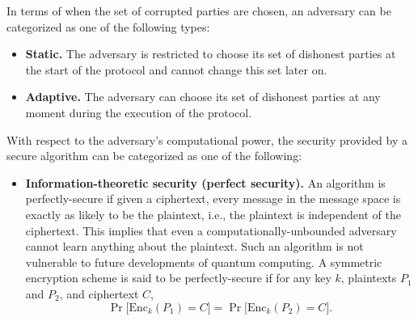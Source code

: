 \documentclass[11pt]{article}
\theoremstyle{plain}
\begin{document}
In terms of when the set of corrupted parties are chosen, an adversary
can be categorized as one of the following types:
\begin{itemize}
	\item \textbf{Static. }The adversary is restricted to choose its set of
	dishonest parties at the start of the protocol and cannot change this
	set later on.
	\item \textbf{Adaptive.} The adversary can choose its set of dishonest parties
	at any moment during the execution of the protocol.
\end{itemize}
With respect to the adversary's computational power, the security
provided by a secure algorithm can be categorized as one of the following:
\begin{itemize}
	\item \textbf{Information-theoretic security (perfect security).} An algorithm
	is perfectly-secure if given a ciphertext, every message in the message
	space is exactly as likely to be the plaintext, i.e., the plaintext
	is independent of the ciphertext. This implies that even a computationally-unbounded
	adversary cannot learn anything about the plaintext. Such an algorithm
	is not vulnerable to future developments of quantum computing. A symmetric
	encryption scheme is said to be perfectly-secure if for any key $k$,
	plaintexts $P_{1}$ and $P_{2}$, and ciphertext $C$,
	\[
	\Pr\big[\text{Enc}_{k}(P_{1})=C\big]=\Pr\big[\text{Enc}_{k}(P_{2})=C\big].
	\]
	

\end{itemize}
\end{document}
